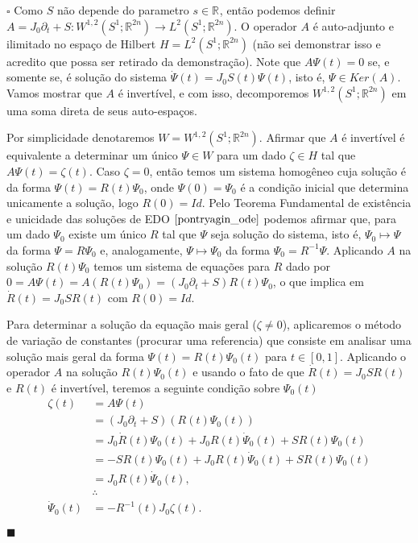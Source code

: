 \documentclass[12pt]{book}
\newenvironment{prova}[1]{$\square$ #1}{\hfill$\blacksquare$}
\newcommand{\circulo}{S^{1}}
\newcommand{\derivadaparcialabrev}[1]{\partial_{#1}}
\newcommand{\espacoLdois}[1]{L^{2}(#1)}
\newcommand{\espacosobolevgeral}[2]{W^{1,#1}(#2)}
\newcommand{\estruturacomplexa}{J_{0}}
\newcommand{\real}[1]{\mathbb{R}^{#1}}
\newcommand{\vermelho}[1]{{\color{red}#1}}
\begin{document}
	\begin{prova}
		Como $S$ não depende do parametro $s \in \real{}$, então podemos definir $A = \estruturacomplexa \derivadaparcialabrev{t} + S: \espacosobolevgeral{2}{\circulo;\real{2n}} \to \espacoLdois{\circulo;\real{2n}}$. \vermelho{O operador $A$ é auto-adjunto e ilimitado no espaço de Hilbert $H=\espacoLdois{\circulo;\real{2n}}$ (não sei demonstrar isso e acredito que possa ser retirado da demonstração).} Note que $A\Psi(t) = 0$ se, e somente se, é solução do sistema $\dot{\Psi}(t)=\estruturacomplexa S(t)\Psi(t)$, isto é, $\Psi \in Ker(A)$. Vamos mostrar que $A$ é invertível, e com isso, decomporemos $\espacosobolevgeral{2}{\circulo;\real{2n}} $ em uma soma direta de seus auto-espaços.
		
		Por simplicidade denotaremos $W = \espacosobolevgeral{2}{\circulo;\real{2n}} $. Afirmar que $A$ é invertível é equivalente a determinar um único $\Psi \in W$ para um dado $\zeta \in H$ tal que $A\Psi(t) = \zeta(t)$. Caso $\zeta = 0$, então temos um sistema homogêneo cuja solução é da forma $\Psi(t) = R(t)\Psi_{0}$, onde $\Psi(0)=\Psi_{0}$ é a condição inicial que determina unicamente a solução, logo $R(0) = Id$. Pelo Teorema Fundamental de existência e unicidade das soluções de EDO $\cite{pontryagin_ode}$ podemos afirmar que, para um dado $\Psi_{0}$ existe um único $R$ tal que $\Psi$ seja solução do sistema, isto é, $\Psi_{0} \mapsto \Psi$ da forma $\Psi = R\Psi_{0}$ e, analogamente, $\Psi \mapsto \Psi_{0}$ da forma $\Psi_{0}=R^{-1}\Psi$. Aplicando $A$ na solução $R(t)\Psi_{0}$ temos um sistema de equações para $R$ dado por 
		$0=A\Psi(t) = A(R(t)\Psi_{0}) = (\estruturacomplexa\derivadaparcialabrev{t}+S)R(t)\Psi_{0}$, o que implica em $\dot{R}(t) = \estruturacomplexa SR(t)$ com $R(0) = Id$. 
		
		Para determinar a solução da equação mais geral ($\zeta\neq 0$), aplicaremos o método de variação de constantes \vermelho{(procurar uma referencia)} que consiste em analisar uma solução mais geral da forma $\Psi(t) = R(t)\Psi_{0}(t)$ para $t \in [0,1]$. Aplicando o operador $A$ na solução $R(t)\Psi_{0}(t)$ e usando o fato de que $\dot{R}(t) = \estruturacomplexa SR(t)$ e $R(t)$ é invertível, teremos a seguinte condição sobre $\Psi_{0}(t)$
		$$
		\begin{aligned}
		\zeta(t) 
		&= A\Psi(t)
		\\ 
		&= (\estruturacomplexa\derivadaparcialabrev{t}+S)(R(t)\Psi_{0}(t)) 
		\\ 
		&= \estruturacomplexa\dot{R}(t)\Psi_{0}(t)+\estruturacomplexa R(t)\dot{\Psi}_{0}(t) + SR(t)\Psi_{0}(t)
		\\
		&= -SR(t)\Psi_{0}(t)+\estruturacomplexa R(t)\dot{\Psi}_{0}(t) + SR(t)\Psi_{0}(t)
		\\
		&= \estruturacomplexa R(t)\dot{\Psi}_{0}(t),
		\\
		&\therefore 
		\\
		\dot{\Psi}_{0}(t) &= -R^{-1}(t)\estruturacomplexa \zeta(t).
		\end{aligned}
		$$
		

\end{prova}
\end{document}
